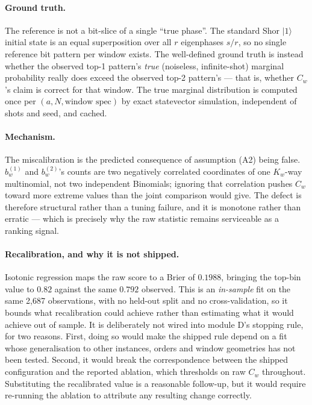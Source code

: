 \documentclass[final,5p,times,longtitle]{elsarticle}
\theoremstyle{plain}
\newcommand{\Cw}{C_w}
\begin{document}
\paragraph{Ground truth.} The reference is not a bit-slice of a single
``true phase''. The standard Shor $|1\rangle$ initial state is an equal
superposition over all $r$ eigenphases $s/r$, so no single reference bit
pattern per window exists. The well-defined ground truth is instead
whether the observed top-1 pattern's \emph{true} (noiseless,
infinite-shot) marginal probability really does exceed the observed
top-2 pattern's --- that is, whether $\Cw$'s claim is correct for that
window. The true marginal distribution is computed once per
$(a,N,\text{window spec})$ by exact statevector simulation, independent
of shots and seed, and cached.

\paragraph{Mechanism.} The miscalibration is the predicted consequence of
assumption (A2) being false. $b^{(1)}_w$ and $b^{(2)}_w$'s counts are two
negatively correlated coordinates of one $K_w$-way multinomial, not two
independent Binomials; ignoring that correlation pushes $\Cw$ toward more
extreme values than the joint comparison would give. The defect is
therefore structural rather than a tuning failure, and it is monotone
rather than erratic --- which is precisely why the raw statistic remains
serviceable as a ranking signal.

\paragraph{Recalibration, and why it is not shipped.} Isotonic regression
\cite{zadrozny2002} maps the raw score to a Brier of $0.1988$, bringing
the top-bin value to $0.82$ against the same $0.792$ observed. This is an
\emph{in-sample} fit on the same 2{,}687 observations, with no held-out
split and no cross-validation, so it bounds what recalibration could
achieve rather than estimating what it would achieve out of sample. It is
deliberately not wired into module D's stopping rule, for two reasons.
First, doing so would make the shipped rule depend on a fit whose
generalisation to other instances, orders and window geometries has not
been tested. Second, it would break the correspondence between the
shipped configuration and the reported ablation, which thresholds on raw
$\Cw$ throughout. Substituting the recalibrated value is a reasonable
follow-up, but it would require re-running the ablation to attribute any
resulting change correctly.
\end{document}
